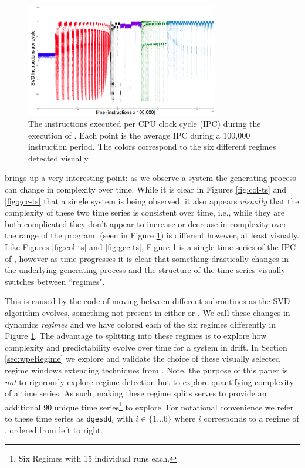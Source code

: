 \begin{figure}[t]
    \centering
    \includegraphics[width=0.75\textwidth]{figs/SVD1RegimesColored}
    \caption{The instructions executed per CPU clock cycle (IPC) during the execution of \svd. Each point is the average IPC during a 100,000 instruction period. The colors correspond to the six different regimes detected visually.}
    \label{fig:svd-ts-colored}
  \end{figure}

\svd brings up a very interesting point: as we observe a system the generating process can change in complexity over time. While it is clear in Figures \ref{fig:col-ts} and \ref{fig:gcc-ts} that a single system is being observed, it also appears \emph{visually} that the complexity of these two time series is consistent over time, i.e., while they are both complicated they don't appear to increase or decrease in complexity over the range of the program. \svd (seen in Figure \ref{fig:svd-ts-colored}) is different however, at least visually. Like Figures \ref{fig:col-ts} and \ref{fig:gcc-ts}, Figure \ref{fig:svd-ts-colored} is a single time series of the IPC of \svd, however as time progresses it is clear that something drastically changes in the underlying generating process and the structure of the time series  visually switches between ``regimes".

This is caused by the code of \svd moving between different subroutines as the SVD algorithm evolves, something not present in either \gcc or \col. We call these changes in \svd dynamics \emph{\svd regimes} and we have colored each of the six regimes differently in Figure \ref{fig:svd-ts-colored}. The advantage to splitting \svd into these regimes is to explore how complexity and predictability evolve over time for a system in drift. In Section \ref{sec:wpeRegime} we explore and validate the choice of these visually selected regime windows extending techniques from \cite{cao2004det}. Note, the purpose of this paper is \emph{not} to rigorously explore regime detection but to explore quantifying complexity of a time series. As such, making these regime splits serves to provide an additional 90 unique time series\footnote{Six Regimes with 15 individual runs each.} to explore. For notational convenience we refer to these time series as {\tt dgesdd$_i$} with $i \in \{1\dots6\}$ where $i$ corresponds to a regime of \svd, ordered from left to right.


